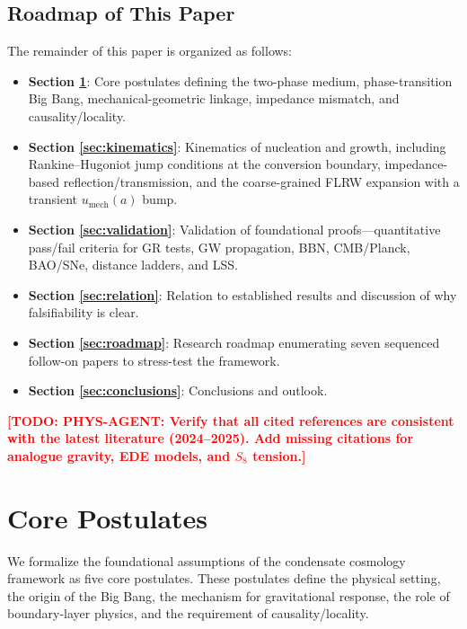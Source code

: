 \documentclass[11pt,a4paper]{article}
\newcommand{\umech}{u_{\mathrm{mech}}}
\theoremstyle{definition}
\newcommand{\TODO}[1]{\textcolor{red}{\textbf{[TODO: #1]}}}
\begin{document}
\subsection{Roadmap of This Paper}
\label{sec:roadmap_intro}

The remainder of this paper is organized as follows:
\begin{itemize}[leftmargin=1.8em]
  \item \textbf{Section \ref{sec:postulates}}: Core postulates defining the two-phase medium, phase-transition Big Bang, mechanical-geometric linkage, impedance mismatch, and causality/locality.
  \item \textbf{Section \ref{sec:kinematics}}: Kinematics of nucleation and growth, including Rankine--Hugoniot jump conditions at the conversion boundary, impedance-based reflection/transmission, and the coarse-grained FLRW expansion with a transient $\umech(a)$ bump.
  \item \textbf{Section \ref{sec:validation}}: Validation of foundational proofs---quantitative pass/fail criteria for GR tests, GW propagation, BBN, CMB/Planck, BAO/SNe, distance ladders, and LSS.
  \item \textbf{Section \ref{sec:relation}}: Relation to established results and discussion of why falsifiability is clear.
  \item \textbf{Section \ref{sec:roadmap}}: Research roadmap enumerating seven sequenced follow-on papers to stress-test the framework.
  \item \textbf{Section \ref{sec:conclusions}}: Conclusions and outlook.
\end{itemize}

\TODO{PHYS-AGENT: Verify that all cited references are consistent with the latest literature (2024--2025). Add missing citations for analogue gravity, EDE models, and $S_8$ tension.}

\section{Core Postulates}
\label{sec:postulates}

We formalize the foundational assumptions of the condensate cosmology framework as five core postulates. These postulates define the physical setting, the origin of the Big Bang, the mechanism for gravitational response, the role of boundary-layer physics, and the requirement of causality/locality.
\end{document}
